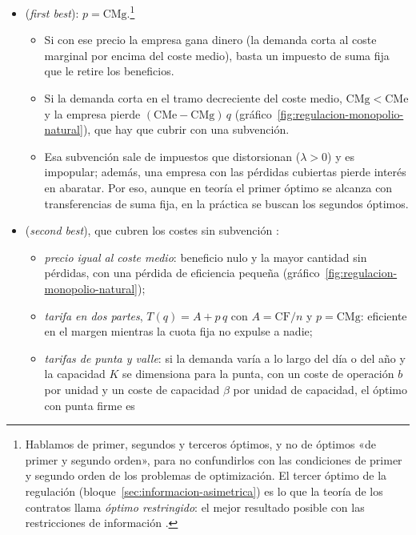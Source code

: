 \documentclass[11pt]{article}
\begin{document}
\begin{itemize}
\item {} (\emph{first best}): $p=\mathrm{CMg}$\nocite{Hotelling1938General}.\footnote{Hablamos de primer, segundos y terceros óptimos, y no de óptimos «de primer y segundo orden», para no confundirlos con las condiciones de primer y segundo orden de los problemas de optimización. El tercer óptimo de la regulación (bloque~\ref{sec:informacion-asimetrica}) es lo que la teoría de los contratos llama \emph{óptimo restringido}: el mejor resultado posible con las restricciones de información  .}
  \begin{itemize}
  \item Si con ese precio la empresa gana dinero (la demanda corta al coste marginal por encima del coste medio), basta un impuesto de suma fija que le retire los beneficios.
  \item Si la demanda corta en el tramo decreciente del coste medio, $\mathrm{CMg}<\mathrm{CMe}$ y la empresa pierde $(\mathrm{CMe}-\mathrm{CMg})\,q$ (gráfico~\ref{fig:regulacion-monopolio-natural}), que hay que cubrir con una subvención.
  \item Esa subvención sale de impuestos que distorsionan ($\lambda>0$) y es impopular; además, una empresa con las pérdidas cubiertas pierde interés en abaratar. Por eso, aunque en teoría el primer óptimo se alcanza con transferencias de suma fija, en la práctica se buscan los segundos óptimos.
  \end{itemize}
\item {} (\emph{second best}), que cubren los costes sin subvención :
  \begin{itemize}
  \item \emph{precio igual al coste medio}: beneficio nulo y la mayor cantidad sin pérdidas, con una pérdida de eficiencia pequeña (gráfico~\ref{fig:regulacion-monopolio-natural});
  \item \emph{tarifa en dos partes}, $T(q)=A+p\,q$ con $A=\mathrm{CF}/n$ y $p=\mathrm{CMg}$\nocite{Coase1946Marginal}: eficiente en el margen mientras la cuota fija no expulse a nadie\nocite{Oi1971Disneyland};
  \item \emph{tarifas de punta y valle}\nocite{Boiteux1949Tarification,Steiner1957Peak}: si la demanda varía a lo largo del día o del año y la capacidad $K$ se dimensiona para la punta, con un coste de operación $b$ por unidad y un coste de capacidad $\beta$ por unidad de capacidad, el óptimo con punta firme es

\end{itemize}
\end{itemize}
\end{document}
